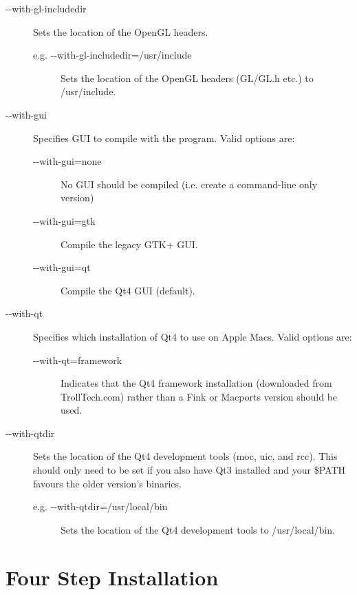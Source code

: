 \begin{description}

	\item[{-}{-}with-gl-includedir]
		Sets the location of the OpenGL headers.
	\begin{description}
		\item[e.g. {-}{-}with-gl-includedir=/usr/include]
			Sets the location of the OpenGL headers (GL/GL.h etc.) to /usr/include.
	\end{description}

	\item[{-}{-}with-gui] Specifies GUI to compile with the program. Valid options are:
	\begin{description}
		\item[{-}{-}with-gui=none\its]
			No GUI should be compiled (i.e. create a command-line only version)
		\item[{-}{-}with-gui=gtk\its]
			Compile the legacy GTK+ GUI.
		\item[{-}{-}with-gui=qt\its]
			Compile the Qt4 GUI (default).
	\end{description}

	\item[{-}{-}with-qt] Specifies which installation of Qt4 to use on Apple Macs. Valid options are:
	\begin{description}
		\item[{-}{-}with-qt=framework]
			Indicates that the Qt4 framework installation (downloaded from TrollTech.com) rather than a Fink or Macports version should be used.
	\end{description}

	\item[{-}{-}with-qtdir] Sets the location of the Qt4 development tools ({\sffamily moc}, {\sffamily uic}, and {\sffamily rcc}). This should only need to be set if you also have Qt3 installed and your \$PATH favours the older version's binaries.
	\begin{description}
		\item[e.g. {-}{-}with-qtdir=/usr/local/bin]
			Sets the location of the Qt4 development tools to /usr/local/bin.
	\end{description}

\end{description}


\section{Four Step Installation}

